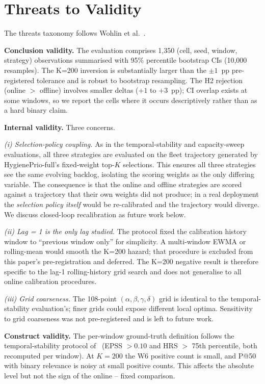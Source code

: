 \section{Threats to Validity}
\label{sec:threats}

The threats taxonomy follows Wohlin et al.~\cite{wohlin2012experimentation}.

\textbf{Conclusion validity.} The evaluation comprises 1{,}350
(cell, seed, window, strategy) observations summarised with 95\%
percentile bootstrap CIs (10{,}000 resamples). The K=200 inversion is
substantially larger than the $\pm 1$~pp pre-registered tolerance and
is robust to bootstrap resampling. The H2 rejection (online $>$
offline) involves smaller deltas ($+1$ to $+3$~pp); CI overlap exists
at some windows, so we report the cells where it occurs descriptively
rather than as a hard binary claim.

\textbf{Internal validity.} Three concerns.

\textit{(i) Selection-policy coupling.} As in the temporal-stability and capacity-sweep evaluations, all
three strategies are evaluated on the fleet trajectory generated by
HygienePrio-full's \textsf{fixed}-weight top-$K$ selections. This
ensures all three strategies see the same evolving backlog, isolating
the scoring weights as the only differing variable. The consequence is
that the online and offline strategies are scored against a trajectory
that their own weights did not produce; in a real deployment the
\textit{selection policy itself} would be re-calibrated and the
trajectory would diverge. We discuss closed-loop recalibration as
future work below.

\textit{(ii) Lag = 1 is the only lag studied.} The protocol fixed the
calibration history window to ``previous window only'' for simplicity.
A multi-window EWMA or rolling-mean would smooth the K=200 hazard;
that procedure is excluded from this paper's pre-registration and
deferred. The K=200 negative result is therefore specific to the
lag-1 rolling-history grid search and does not generalise to all
online calibration procedures.

\textit{(iii) Grid coarseness.} The 108-point $(\alpha, \beta, \gamma,
\delta)$ grid is identical to the temporal-stability evaluation's; finer grids could expose
different local optima. Sensitivity to grid coarseness was not
pre-registered and is left to future work.

\textbf{Construct validity.} The per-window ground-truth definition
follows the temporal-stability protocol of~\cite{paper5temporal}
(EPSS $> 0.10$ and HRS $>$ 75th percentile, both recomputed per
window). At $K = 200$ the W6 positive count is
small, and P@50 with binary relevance is noisy at small positive
counts. This affects the absolute level but not the sign of the
\textsf{online} -- \textsf{fixed} comparison.

